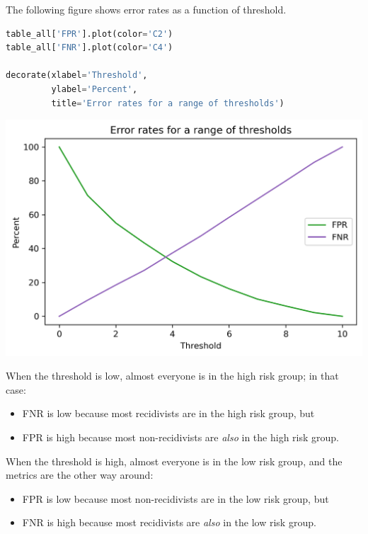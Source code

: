 The following figure shows error rates as a function of threshold.

\begin{lstlisting}[language=Python,style=source]
table_all['FPR'].plot(color='C2')
table_all['FNR'].plot(color='C4')

decorate(xlabel='Threshold', 
         ylabel='Percent',
         title='Error rates for a range of thresholds')
\end{lstlisting}

\begin{center}
\includegraphics[scale=0.75]{02_calibration_files/02_calibration_37_0.png}
\end{center}

When the threshold is low, almost everyone is in the high risk group; in
that case:

\begin{itemize}
\item
  FNR is low because most recidivists are in the high risk group, but
\item
  FPR is high because most non-recidivists are \emph{also} in the high
  risk group.
\end{itemize}

When the threshold is high, almost everyone is in the low risk group,
and the metrics are the other way around:

\begin{itemize}
\item
  FPR is low because most non-recidivists are in the low risk group, but
\item
  FNR is high because most recidivists are \emph{also} in the low risk
  group.
\end{itemize}

